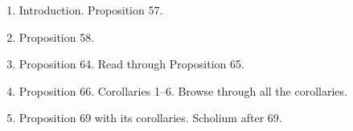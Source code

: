 \documentclass[10pt]{article}
\newcounter{includepdfpage}
\begin{document}
	\begin{enumerate}[noitemsep] \item Introduction.
			Proposition 57.  \item Proposition
			58.  \item Proposition 64. Read
			through Proposition 65.  \item
			Proposition 66. Corollaries 1--6.
			Browse through all the corollaries.
		\item Proposition 69 with its corollaries.
			Scholium after 69.  \end{enumerate}
	\newpage \setcounter{page}{1}
	
\end{document}
